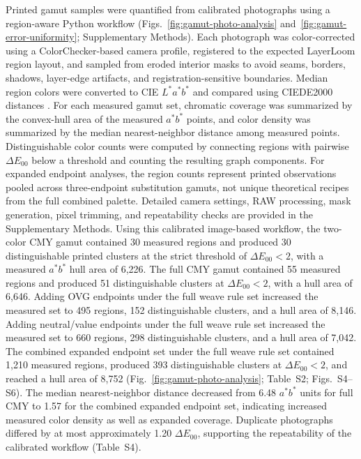 \documentclass[5p,times,numbers]{elsarticle}
\begin{document}
Printed gamut samples were quantified from calibrated photographs using a region-aware Python workflow (Figs.~\ref{fig:gamut-photo-analysis} and~\ref{fig:gamut-error-uniformity}; Supplementary Methods). Each photograph was color-corrected using a ColorChecker-based camera profile, registered to the expected LayerLoom region layout, and sampled from eroded interior masks to avoid seams, borders, shadows, layer-edge artifacts, and registration-sensitive boundaries. Median region colors were converted to CIE \(L^*a^*b^*\) and compared using CIEDE2000 distances \citep{iec_61966_2_1_1999,cie_11664_4_2019,cie_11664_6_2022,luo2001ciede2000,sharma2005ciede2000}. For each measured gamut set, chromatic coverage was summarized by the convex-hull area of the measured \(a^*b^*\) points, and color density was summarized by the median nearest-neighbor distance among measured points. Distinguishable color counts were computed by connecting regions with pairwise \(\Delta E_{00}\) below a threshold and counting the resulting graph components. For expanded endpoint analyses, the region counts represent printed observations pooled across three-endpoint substitution gamuts, not unique theoretical recipes from the full combined palette. Detailed camera settings, RAW processing, mask generation, pixel trimming, and repeatability checks are provided in the Supplementary Methods.
Using this calibrated image-based workflow, the two-color CMY gamut contained 30 measured regions and produced 30 distinguishable printed clusters at the strict threshold of \(\Delta E_{00}<2\), with a measured \(a^*b^*\) hull area of 6,226.
The full CMY gamut contained 55 measured regions and produced 51 distinguishable clusters at \(\Delta E_{00}<2\), with a hull area of 6,646.
Adding OVG endpoints under the full weave rule set increased the measured set to 495 regions, 152 distinguishable clusters, and a hull area of 8,146.
Adding neutral/value endpoints under the full weave rule set increased the measured set to 660 regions, 298 distinguishable clusters, and a hull area of 7,042.
The combined expanded endpoint set under the full weave rule set contained 1,210 measured regions, produced 393 distinguishable clusters at \(\Delta E_{00}<2\), and reached a hull area of 8,752 (Fig.~\ref{fig:gamut-photo-analysis}; Table~S2; Figs.~S4--S6).
The median nearest-neighbor distance decreased from 6.48 \(a^*b^*\) units for full CMY to 1.57 for the combined expanded endpoint set, indicating increased measured color density as well as expanded coverage.
Duplicate photographs differed by at most approximately 1.20 \(\Delta E_{00}\), supporting the repeatability of the calibrated workflow (Table~S4).
\end{document}
